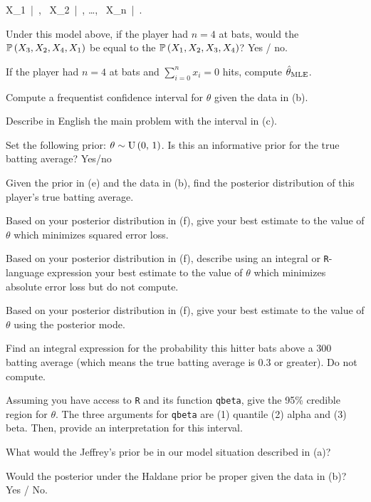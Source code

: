 \documentclass[12pt]{article}
\begin{document}
\beqn
X_1~|~\theta, ~X_2~|~\theta, \ldots, ~X_n~|~\theta \iid \bernoulli{\theta}.
\eeqn

Under this model above, if the player had $n=4$ at bats, would the $\mathbb{P}\left(X_3,X_2,X_4,X_1\right)$ be equal to the $\mathbb{P}\left(X_1,X_2,X_3,X_4\right)$? Yes / no. 

 If the player had $n=4$ at bats and $\sum_{i=0}^n x_i=0$ hits, compute $\hat{\theta}_{\mathrm{MLE}}$.

 Compute a frequentist confidence interval for $\theta$ given the data in (b).


 Describe in English the main problem with the interval in (c).

 Set the following prior: $\theta \sim \mathrm{U}\left(0,\,1\right)$. Is this an informative prior for the true batting average? Yes/no 

 Given the prior in (e) and the data in (b), find the posterior distribution of this player's true batting average.

 Based on your posterior distribution in (f), give your best estimate to the value of $\theta$ which minimizes squared error loss.

 Based on your posterior distribution in (f), describe using an integral or \texttt{R}-language expression your best estimate to the value of $\theta$ which minimizes absolute error loss but do not compute.

 Based on your posterior distribution in (f), give your best estimate to the value of $\theta$ using the posterior mode.

 Find an integral expression for the probability this hitter bats above a 300 batting average (which means the true batting average is 0.3 or greater). Do not compute. 

 Assuming you have access to \texttt{R} and its function \texttt{qbeta}, give the 95\% credible region for $\theta$. The three arguments for \texttt{qbeta} are (1) quantile (2) alpha and (3) beta. Then, provide an interpretation for this interval. 

 What would the Jeffrey's prior be in our model situation described in (a)? 

 Would the posterior under the Haldane prior be proper given the data in (b)? Yes / No. 
\end{document}
